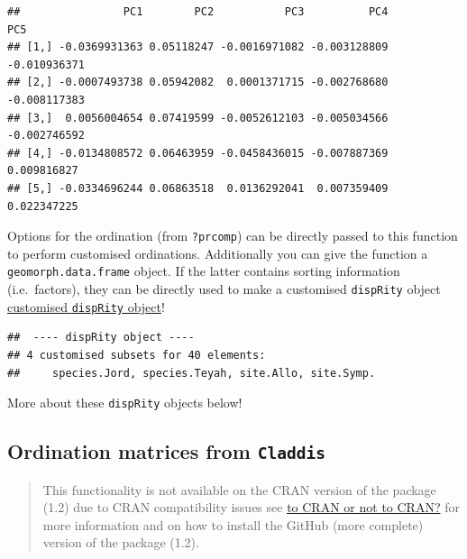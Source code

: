 \documentclass[]{book}
\newenvironment{Shaded}{\begin{snugshade}}{\end{snugshade}}
\newcommand{\KeywordTok}[1]{\textcolor[rgb]{0.13,0.29,0.53}{\textbf{#1}}}
\newcommand{\DataTypeTok}[1]{\textcolor[rgb]{0.13,0.29,0.53}{#1}}
\newcommand{\StringTok}[1]{\textcolor[rgb]{0.31,0.60,0.02}{#1}}
\newcommand{\OperatorTok}[1]{\textcolor[rgb]{0.81,0.36,0.00}{\textbf{#1}}}
\newcommand{\NormalTok}[1]{#1}
\theoremstyle{definition}
\theoremstyle{definition}
\theoremstyle{definition}
\theoremstyle{remark}
\begin{document}
\begin{verbatim}
##                PC1        PC2           PC3          PC4          PC5
## [1,] -0.0369931363 0.05118247 -0.0016971082 -0.003128809 -0.010936371
## [2,] -0.0007493738 0.05942082  0.0001371715 -0.002768680 -0.008117383
## [3,]  0.0056004654 0.07419599 -0.0052612103 -0.005034566 -0.002746592
## [4,] -0.0134808572 0.06463959 -0.0458436015 -0.007887369  0.009816827
## [5,] -0.0334696244 0.06863518  0.0136292041  0.007359409  0.022347225
\end{verbatim}

Options for the ordination (from \texttt{?prcomp}) can be directly
passed to this function to perform customised ordinations. Additionally
you can give the function a \texttt{geomorph.data.frame} object. If the
latter contains sorting information (i.e.~factors), they can be directly
used to make a customised \texttt{dispRity} object
\protect\hyperlink{customised-subsets}{customised \texttt{dispRity}
object}!

\begin{Shaded}
\end{Shaded}

\begin{verbatim}
##  ---- dispRity object ---- 
## 4 customised subsets for 40 elements:
##     species.Jord, species.Teyah, site.Allo, site.Symp.
\end{verbatim}

More about these \texttt{dispRity} objects below!

\hypertarget{Claddis-ordination}{\subsection{\texorpdfstring{Ordination
matrices from
\texttt{Claddis}}{Ordination matrices from Claddis}}\label{Claddis-ordination}}

\begin{quote}
This functionality is not available on the CRAN version of the package
(1.2) due to CRAN compatibility issues see \protect\hyperlink{noCRAN}{to
CRAN or not to CRAN?} for more information and on how to install the
GitHub (more complete) version of the package (1.2).
\end{quote}
\end{document}
